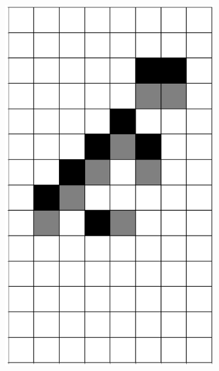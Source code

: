\documentclass[12pt]{article}
\numberwithin{figure}{section} %
\begin{document}
\begin{figure}[H]
\begin{subfigure}{0.18\textwidth}
     		\includegraphics[width=\linewidth]{Section4/17.3}
     		\subcaption{}
   	\end{subfigure}
        	\begin{subfigure}{0.18\textwidth}
     		\centering

\end{subfigure}
\end{figure}
\end{document}
